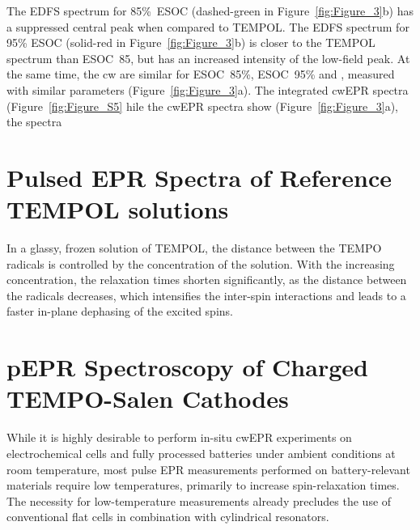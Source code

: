 The EDFS spectrum for 85\%~ESOC (dashed-green in Figure~\ref{fig:Figure_3}b) has a suppressed central peak when compared to  TEMPOL. The EDFS spectrum for 95\% ESOC (solid-red in Figure~\ref{fig:Figure_3}b) is closer to the TEMPOL spectrum than ESOC~85, but has an increased intensity of the low-field peak. At the same time, the cw are similar for ESOC~85\%, ESOC~95\% and , measured with similar parameters (Figure~\ref{fig:Figure_3}a). The integrated cwEPR spectra  (Figure~\ref{fig:Figure_S5}  hile the cwEPR spectra  show  (Figure~\ref{fig:Figure_3}a), the   spectra 







\section{Pulsed EPR Spectra of Reference TEMPOL solutions}
In a glassy, frozen solution of TEMPOL, the distance between the TEMPO radicals is controlled by the concentration of the solution. With the increasing concentration, the relaxation times shorten significantly, as the distance between the radicals decreases, which intensifies the inter-spin interactions and leads to a faster in-plane dephasing of the excited spins. 

\section{pEPR Spectroscopy of Charged TEMPO-Salen Cathodes}

While it is highly desirable to perform in-situ cwEPR experiments on electrochemical cells and fully processed batteries under ambient conditions at room temperature, most pulse EPR measurements performed on battery-relevant materials require low temperatures, primarily to increase spin-relaxation times. The necessity for low-temperature measurements already precludes the use of conventional flat cells in combination with cylindrical resonators.\cite{wadhawan2007_encofelectrochem, toybenshlak2019_isrjchem}


